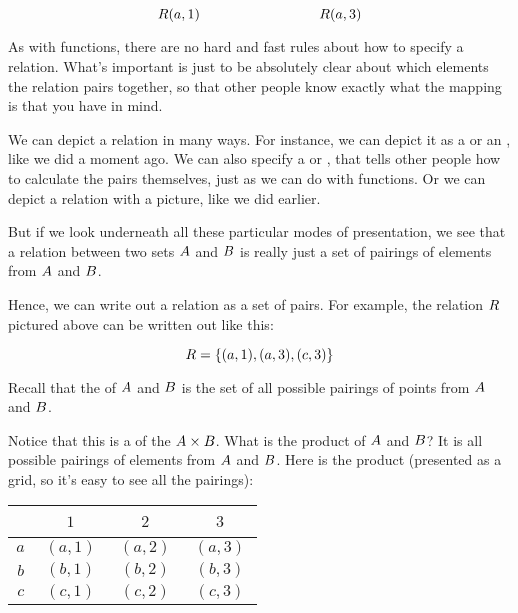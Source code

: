 \documentclass[../../../main.tex]{subfiles}
\begin{document}
\begin{equation*}
  \R{R}(a, 1) \hskip 3cm \R{R}(a, 3)
\end{equation*}

\begin{aside}
  \begin{remark}
    As with functions, there are no hard and fast rules about how to specify a relation. What's important is just to be absolutely clear about which elements the relation pairs together, so that other people know exactly what the mapping is that you have in mind.
  \end{remark}
\end{aside}

We can depict a relation in many ways. For instance, we can depict it as a  or an , like we did a moment ago. We can also specify a  or , that tells other people how to calculate the pairs themselves, just as we can do with functions. Or we can depict a relation with a picture, like we did earlier.

But if we look underneath all these particular modes of presentation, we see that a relation between two sets $A$ and $B$ is really just a set of pairings of elements from $A$ and $B$. 

Hence, we can write out a relation as a set of pairs. For example, the relation $R$ pictured above can be written out like this:

\begin{equation*}
  R = \{ (a, 1), (a, 3), (c, 3) \}
\end{equation*}

\begin{aside}
  \begin{remark}
    Recall that the  of $A$ and $B$ is the set of all possible pairings of points from $A$ and $B$.
  \end{remark}
\end{aside}

Notice that this is a  of the  $A \times B$. What is the product of $A$ and $B$? It is all possible pairings of elements from $A$ and $B$. Here is the product (presented as a grid, so it's easy to see all the pairings):

\begin{center}
  \begin{tabular}{| c | c | c | c |}
    \hline
    ~   & $1$        & $2$        & $3$        \\ \hline
    $a$ & $~(a, 1)~$ & $~(a, 2)~$ & $~(a, 3)~$ \\ \hline
    $b$ & $~(b, 1)~$ & $~(b, 2)~$ & $~(b, 3)~$ \\ \hline
    $c$ & $~(c, 1)~$ & $~(c, 2)~$ & $~(c, 3)~$ \\ \hline
  \end{tabular}
\end{center}
\end{document}
